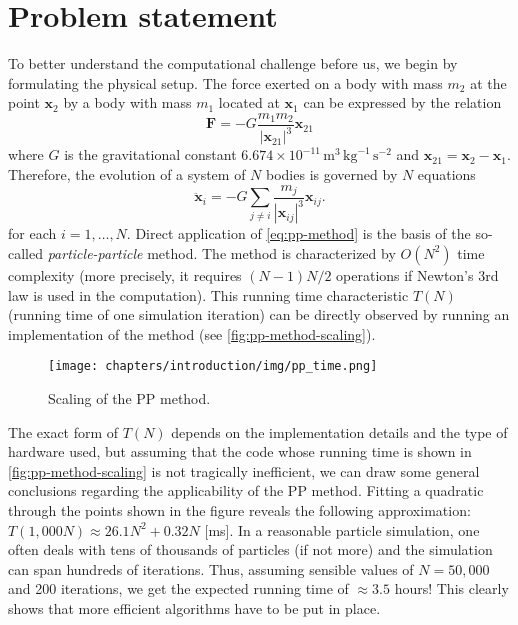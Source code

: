 \section{Problem statement}
To better understand the computational challenge before us, we begin by formulating the physical setup.
The force exerted on a body with mass $m_2$ at the point $\mathbf{x}_2$ by a body with mass $m_1$ located at $\mathbf{x}_1$ can be expressed by the relation
\begin{equation}\label{eq:law-of-uni-grav}
    \mathbf{F} = -G\frac{m_1m_2}{|\mathbf{x}_{21}|^3}\mathbf{x}_{21}
\end{equation}
where $G$ is the gravitational constant $6.674\times 10^{-11}\, \mathrm{m}^3 \,\mathrm{kg}^{-1}\,\mathrm{s}^{-2}$ and $\mathbf{x}_{21} = \mathbf{x}_2 - \mathbf{x}_1$.
Therefore, the evolution of a system of $N$ bodies is governed by $N$ equations
\begin{equation}\label{eq:pp-method}
    \ddot{\mathbf{x}}_i = -G\sum_{j\neq i} \frac{m_j}{|\mathbf{x}_{ij}|^3}\mathbf{x}_{ij}.
\end{equation}
for each $i = 1,\dots, N$.
Direct application of \autoref{eq:pp-method} is the basis of the so-called \textit{particle-particle} method.
The method is characterized by $O(N^2)$ time complexity (more precisely, it requires $(N-1)N/2$ operations if Newton's 3rd law is used in the computation).
This running time characteristic $T(N)$ (running time of one simulation iteration) can be directly observed by running an implementation of the method (see \autoref{fig:pp-method-scaling}).
\begin{figure}[htp]
    \centering
    \texttt{[image: chapters/introduction/img/pp\_time.png]}
    \caption{Scaling of the PP method.}
    \label{fig:pp-method-scaling}
\end{figure}
The exact form of $T(N)$ depends on the implementation details and the type of hardware used, but assuming that the code whose running time is shown in \autoref{fig:pp-method-scaling} is not tragically inefficient, we can draw some general conclusions regarding the applicability of the PP method.
Fitting a quadratic through the points shown in the figure reveals the following approximation: $T(1{,}000N) \approx 26.1N^2 + 0.32N$ [ms].
In a reasonable particle simulation, one often deals with tens of thousands of particles (if not more) and the simulation can span hundreds of iterations.
Thus, assuming sensible values of $N = 50{,}000$ and 200 iterations, we get the expected running time of $\approx 3.5$ hours!
This clearly shows that more efficient algorithms have to be put in place.
